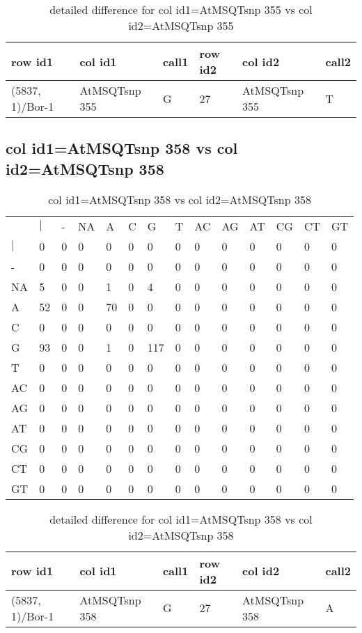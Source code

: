 \begin{center}
\begin{longtable}{|l|l|l|l|l|l|}
\caption{detailed difference for col id1=AtMSQTsnp 355 vs col id2=AtMSQTsnp 355} \label{table_dm877}\\
\hline
row id1&col id1&call1&row id2&col id2&call2\\
\hline
(5837, 1)/Bor-1&AtMSQTsnp 355&G&27&AtMSQTsnp 355&T\\
\hline
\end{longtable}
\end{center}

\subsection{col id1=AtMSQTsnp 358 vs col id2=AtMSQTsnp 358}
\begin{center}
\begin{longtable}{|l|l|l|l|l|l|l|l|l|l|l|l|l|l|}
\caption{col id1=AtMSQTsnp 358 vs col id2=AtMSQTsnp 358} \label{table_dm878}\\
\hline
\\
\hline
&$|$&-&NA&A&C&G&T&AC&AG&AT&CG&CT&GT\\
$|$&0&0&0&0&0&0&0&0&0&0&0&0&0\\
-&0&0&0&0&0&0&0&0&0&0&0&0&0\\
NA&5&0&0&1&0&4&0&0&0&0&0&0&0\\
A&52&0&0&70&0&0&0&0&0&0&0&0&0\\
C&0&0&0&0&0&0&0&0&0&0&0&0&0\\
G&93&0&0&1&0&117&0&0&0&0&0&0&0\\
T&0&0&0&0&0&0&0&0&0&0&0&0&0\\
AC&0&0&0&0&0&0&0&0&0&0&0&0&0\\
AG&0&0&0&0&0&0&0&0&0&0&0&0&0\\
AT&0&0&0&0&0&0&0&0&0&0&0&0&0\\
CG&0&0&0&0&0&0&0&0&0&0&0&0&0\\
CT&0&0&0&0&0&0&0&0&0&0&0&0&0\\
GT&0&0&0&0&0&0&0&0&0&0&0&0&0\\
\hline
\end{longtable}
\end{center}

\begin{center}
\begin{longtable}{|l|l|l|l|l|l|}
\caption{detailed difference for col id1=AtMSQTsnp 358 vs col id2=AtMSQTsnp 358} \label{table_dm879}\\
\hline
row id1&col id1&call1&row id2&col id2&call2\\
\hline
(5837, 1)/Bor-1&AtMSQTsnp 358&G&27&AtMSQTsnp 358&A\\
\hline
\end{longtable}
\end{center}

